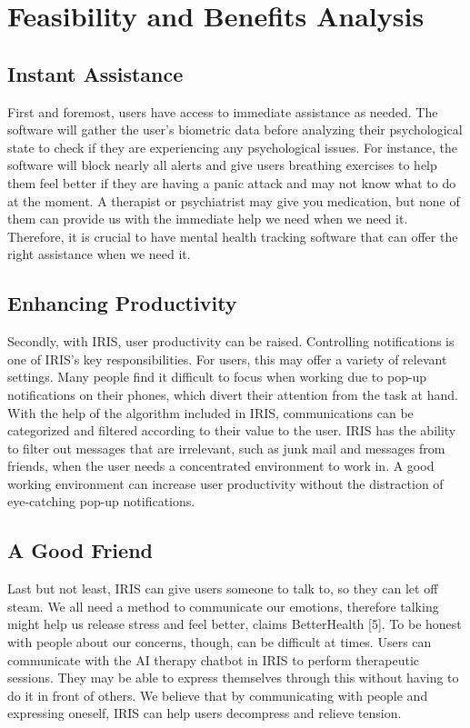 \documentclass[12pt]{article}
\begin{document}
\section*{Feasibility and Benefits Analysis}
\subsection*{Instant Assistance}
First and foremost, users have access to immediate assistance as needed. The software will gather the user's biometric data before analyzing their psychological state to check if they are experiencing any psychological issues. For instance, the software will block nearly all alerts and give users breathing exercises to help them feel better if they are having a panic attack and may not know what to do at the moment. A therapist or psychiatrist may give you medication, but none of them can provide us with the immediate help we need when we need it. Therefore, it is crucial to have mental health tracking software that can offer the right assistance when we need it.

\subsection*{Enhancing Productivity}
Secondly, with IRIS, user productivity can be raised. Controlling notifications is one of IRIS's key responsibilities. For users, this may offer a variety of relevant settings. Many people find it difficult to focus when working due to pop-up notifications on their phones, which divert their attention from the task at hand. With the help of the algorithm included in IRIS, communications can be categorized and filtered according to their value to the user. IRIS has the ability to filter out messages that are irrelevant, such as junk mail and messages from friends, when the user needs a concentrated environment to work in. A good working environment can increase user productivity without the distraction of eye-catching pop-up notifications.


\subsection*{A Good Friend}
Last but not least, IRIS can give users someone to talk to, so they can let off steam. We all need a method to communicate our emotions, therefore talking might help us release stress and feel better, claims BetterHealth [5]. To be honest with people about our concerns, though, can be difficult at times. Users can communicate with the AI therapy chatbot in IRIS to perform therapeutic sessions. They may be able to express themselves through this without having to do it in front of others. We believe that by communicating with people and expressing oneself, IRIS can help users decompress and relieve tension.
\end{document}
